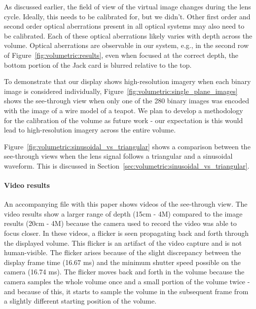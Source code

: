 As discussed earlier, the field of view of the virtual image changes during the lens cycle. Ideally, this needs to be calibrated for, but we didn't. Other first order and second order optical aberrations present in all optical systems may also need to be calibrated. Each of these optical aberrations likely varies with depth across the volume. Optical aberrations are observable in our system, e.g., in the second row of Figure~\ref{fig:volumetric:results}, even when focused at the correct depth, the bottom portion of the Jack card is blurred relative to the top. 

To demonstrate that our display shows high-resolution imagery when each binary image is considered individually, Figure~\ref{fig:volumetric:single_plane_images} shows the see-through view when only one of the 280 binary images was encoded with the image of a wire model of a teapot. We plan to develop a methodology for the calibration of the volume as future work - our expectation is this would lead to high-resolution imagery across the entire volume. 

Figure~\ref{fig:volumetric:sinusoidal_vs_triangular} shows a comparison between the see-through views when the lens signal follows a triangular and a sinusoidal waveform. This is discussed in Section~\ref{sec:volumetric:sinusoidal_vs_triangular}.



\paragraph{Video results}
An accompanying file with this paper shows videos of the see-through view. The video results show a larger range of depth (15cm - 4M) compared to the image results (20cm - 4M) because the camera used to record the video was able to focus closer. In these videos, a flicker is seen propagating back and forth through the displayed volume. This flicker is an artifact of the video capture and is not human-visible. The flicker arises because of the slight discrepancy between the display frame time (16.67 ms) and the minimum shutter speed possible on the camera (16.74 ms). The flicker moves back and forth in the volume because the camera samples the whole volume once and a small portion of the volume twice - and because of this, it starts to sample the volume in the subsequent frame from a slightly different starting position of the volume. 

